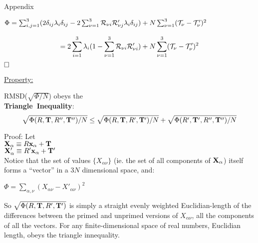 \begin{appendix}{Appendix}
\begin{center}
$\Phi = 
  \sum_{i,j=1}^3 (
  2 \delta_{i j} \lambda_i \delta_{i j} -
  2 \sum_{\nu=1}^3 {\cal R}_{\nu i} {\cal R}'_{\nu j} \lambda_i \delta_{i j}
  )
  + N \sum_{\nu=1}^3 ({\cal T}_\nu - {\cal T}'_\nu)^2
$
\end{center}
\begin{equation}
= 2 \sum_{i=1}^3\lambda_i (1 - \sum_{\nu=1}^3 {\cal R}_{\nu i} {\cal R}'_{\nu i})
   + N \sum_{\nu=1}^3({\cal T}_\nu - {\cal T}'_\nu)^2     \label{eq:simplified_phi}
\end{equation}
${\bf \Box}$

\underline{Property:}

RMSD($\sqrt{\Phi / N}$)
obeys the\\
\mbox{\bf Triangle Inequality}:
\begin{equation}
\sqrt{\Phi(R,{\bf T}, R'',{\bf T''}) / N}
\leq
\sqrt{\Phi(R,{\bf T},R',{\bf T'}) / N} +
\sqrt{\Phi(R',{\bf T'},R'',{\bf T''}) / N}
\end{equation}


   Proof:
Let \\
${\bf X_\alpha} \equiv R {\bf x_\alpha} + {\bf T}$\\
${\bf X'_\alpha} \equiv R' {\bf x_\alpha} + {\bf T'}$\\

Notice that the set of values $\{ X_{\alpha \nu} \}$ 
(ie. the set of all components of ${\bf X_\alpha}$)
itself forms a ``vector'' in a $3 N$ dimensional space, and:\\
\begin{center}
$ \Phi = \sum_{\alpha, \nu} (X_{\alpha \nu} - X'_{\alpha \nu})^2 $
\end{center}
So $\sqrt{\Phi(R,{\bf T}, R',{\bf T'})}$ is simply
a straight evenly weighted Euclidian-length of the differences between
the primed and unprimed versions of $X_{\alpha \nu}$,
all the components of all the vectors.
For any finite-dimensional space of real numbers, Euclidian length,
obeys the triangle innequality.



\end{appendix}




